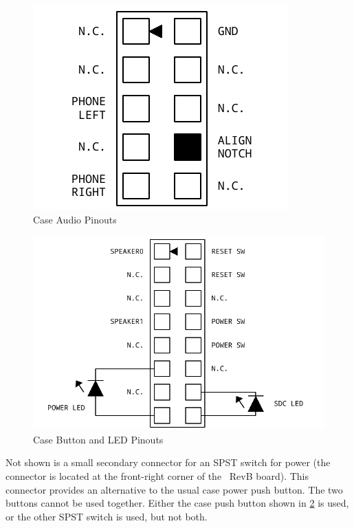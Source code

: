 \begin{figure}[ht]
    \begin{center}
        \includegraphics[scale=0.65]{images/f256_port_audio.pdf}
    \end{center}
    \caption{Case Audio Pinouts}
    \label{fig:port_audio}
\end{figure}

\begin{figure}[ht]
    \begin{center}
        \includegraphics[scale=0.65]{images/f256_port_case.pdf}
    \end{center}
    \caption{Case Button and LED Pinouts}
    \label{fig:port_case}
\end{figure}

Not shown is a small secondary connector for an SPST switch for power (the connector is located at the front-right corner of the \fjr\ RevB board). This connector provides an alternative to the usual case power push button. The two buttons cannot be used together. Either the case push button shown in \ref{fig:port_case} is used, or the other SPST switch is used, but not both.

